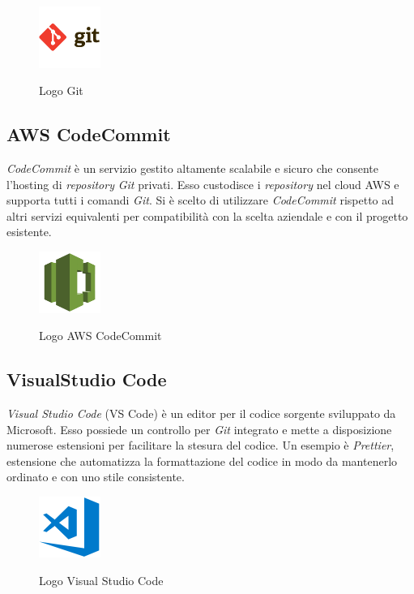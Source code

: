 	\begin{figure}[H]
		\centering
		\includegraphics[width=2cm]{immagini/git.png} \\
		\caption{\label{fig:logo_git} Logo Git}
	\end{figure}

	\subsection{AWS CodeCommit}
	\emph{CodeCommit} è un servizio gestito altamente scalabile e sicuro che consente l'hosting di \emph{repository} \emph{Git} privati. Esso custodisce i \emph{repository} nel cloud \gls{AWS} e supporta tutti i comandi \emph{Git}. Si è scelto di utilizzare \emph{CodeCommit} rispetto ad altri servizi equivalenti per compatibilità con la scelta aziendale e con il progetto esistente.
	
	\begin{figure}[H]
		\centering
		\includegraphics[width=2cm]{immagini/codecommit.png} \\
		\caption{\label{fig:logo_codecommit} Logo AWS CodeCommit}
	\end{figure}

	\subsection{VisualStudio Code}
\emph{Visual Studio Code} (VS Code) è un editor per il codice sorgente sviluppato da Microsoft. Esso possiede un controllo per \emph{Git} integrato e mette a disposizione numerose estensioni per facilitare la stesura del codice. Un esempio è \emph{Prettier}, estensione che automatizza la formattazione del codice in modo da mantenerlo ordinato e con uno stile consistente.
	
	\begin{figure}[H]
		\centering
		\includegraphics[width=2cm]{immagini/visual-studio-code.png} \\
		\caption{\label{fig:logo_vscode} Logo Visual Studio Code}
	\end{figure}

